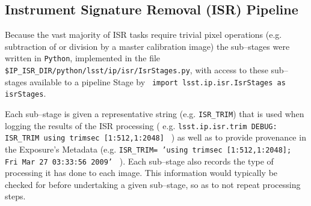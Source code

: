 
\subsection{Instrument Signature Removal (ISR) Pipeline}
\label{sec:isr}

Because the vast majority of ISR tasks require trivial pixel
operations (e.g. subtraction of or division by a master calibration
image) the sub--stages were written in {\tt Python}, implemented in
the file {\tt \$IP\_ISR\_DIR/python/lsst/ip/isr/IsrStages.py}, with
access to these sub--stages available to a pipeline Stage by {\tt
import lsst.ip.isr.IsrStages as isrStages}.

Each sub--stage is given a representative string (e.g. \texttt{ISR\_TRIM})
%
that is used when logging the results of the ISR processing (
e.g. {\tt lsst.ip.isr.trim DEBUG: ISR\_TRIM using trimsec
[1:512,1:2048] } )
%
as well as to provide provenance in the Exposure's Metadata 
%
(e.g. {\tt ISR\_TRIM= 'using trimsec [1:512,1:2048]; Fri Mar 27
03:33:56 2009' } ).
%
Each sub--stage also records the type of
processing it has done to each image.  This information would typically be
checked for before undertaking a given sub--stage, so as to not repeat
processing steps.

